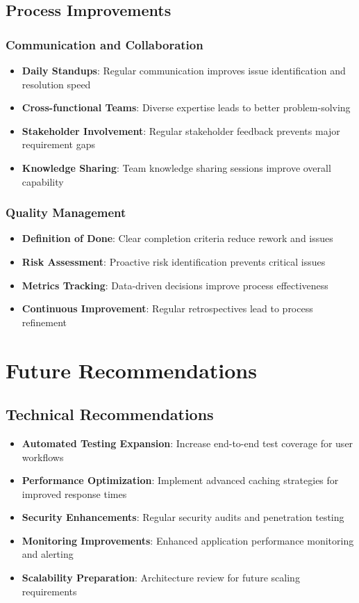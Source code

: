 \documentclass[12pt,a4paper]{article}
\begin{document}
\subsection{Process Improvements}

\subsubsection{Communication and Collaboration}
\begin{itemize}
    \item \textbf{Daily Standups}: Regular communication improves issue identification and resolution speed
    \item \textbf{Cross-functional Teams}: Diverse expertise leads to better problem-solving
    \item \textbf{Stakeholder Involvement}: Regular stakeholder feedback prevents major requirement gaps
    \item \textbf{Knowledge Sharing}: Team knowledge sharing sessions improve overall capability
\end{itemize}

\subsubsection{Quality Management}
\begin{itemize}
    \item \textbf{Definition of Done}: Clear completion criteria reduce rework and issues
    \item \textbf{Risk Assessment}: Proactive risk identification prevents critical issues
    \item \textbf{Metrics Tracking}: Data-driven decisions improve process effectiveness
    \item \textbf{Continuous Improvement}: Regular retrospectives lead to process refinement
\end{itemize}

\section{Future Recommendations}

\subsection{Technical Recommendations}

\begin{itemize}
    \item \textbf{Automated Testing Expansion}: Increase end-to-end test coverage for user workflows
    \item \textbf{Performance Optimization}: Implement advanced caching strategies for improved response times
    \item \textbf{Security Enhancements}: Regular security audits and penetration testing
    \item \textbf{Monitoring Improvements}: Enhanced application performance monitoring and alerting
    \item \textbf{Scalability Preparation}: Architecture review for future scaling requirements
\end{itemize}
\end{document}
